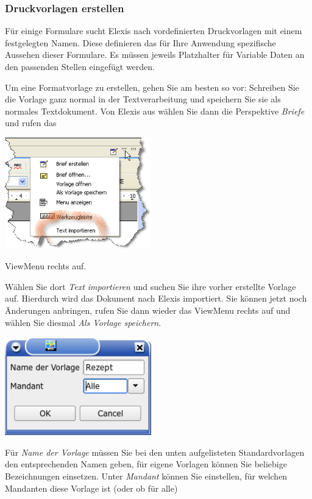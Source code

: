\subsubsection{Druckvorlagen erstellen}
Für einige Formulare sucht Elexis nach vordefinierten Druckvorlagen mit einem festgelegten Namen. Diese definieren das für Ihre Anwendung spezifische Aussehen dieser Formulare. Es müssen jeweils Platzhalter für Variable Daten an den passenden Stellen eingefügt werden.

Um eine Formatvorlage zu erstellen, gehen Sie am besten so vor: Schreiben Sie die Vorlage ganz normal in der Textverarbeitung und speichern Sie sie als normales Textdokument. Von Elexis aus wählen Sie dann die Perspektive \textit{Briefe} und rufen das

\includegraphics[width=2.5in]{images/import.png}

ViewMenu rechts auf.

Wählen Sie dort \textit{Text importieren} und suchen Sie ihre vorher erstellte Vorlage auf.
 Hierdurch wird das Dokument nach Elexis importiert. Sie können jetzt noch Änderungen anbringen, rufen Sie dann wieder das ViewMenu rechts auf und wählen Sie diesmal \textit{Als Vorlage speichern}.

\includegraphics[width=2.5in]{images/rezept1.png}

Für \textit{Name der Vorlage} müssen Sie bei den unten aufgelisteten Standardvorlagen den entsprechenden Namen geben, für eigene Vorlagen können Sie beliebige Bezeichnungen einsetzen. Unter \textit{Mandant} können Sie einstellen, für welchen Mandanten diese Vorlage ist (oder ob für alle)

